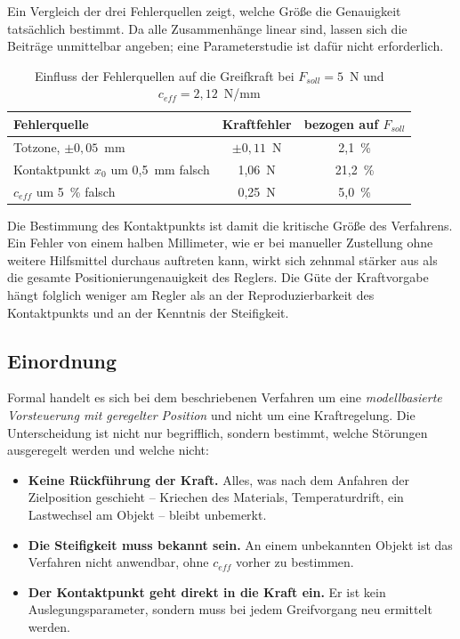 Ein Vergleich der drei Fehlerquellen zeigt, welche Größe die Genauigkeit tatsächlich
bestimmt. Da alle Zusammenhänge linear sind, lassen sich die Beiträge unmittelbar
angeben; eine Parameterstudie ist dafür nicht erforderlich.

\begin{table}[htbp]
    \centering
    \caption{Einfluss der Fehlerquellen auf die Greifkraft bei $F_{soll} = 5$~N und
             $c_{eff} = 2{,}12$~N/mm}
    \label{tab:fehlerquellen}
    \begin{tabular}{lcc}
        \hline
        Fehlerquelle & Kraftfehler & bezogen auf $F_{soll}$ \\
        \hline
        Totzone, $\pm 0{,}05$~mm          & $\pm 0{,}11$~N & 2,1~\% \\
        Kontaktpunkt $x_0$ um 0,5~mm falsch & 1,06~N        & 21,2~\% \\
        $c_{eff}$ um 5~\% falsch           & 0,25~N        & 5,0~\% \\
        \hline
    \end{tabular}
\end{table}

Die Bestimmung des Kontaktpunkts ist damit die kritische Größe des Verfahrens. Ein Fehler
von einem halben Millimeter, wie er bei manueller Zustellung ohne weitere Hilfsmittel
durchaus auftreten kann, wirkt sich zehnmal stärker aus als die gesamte
Positionierungenauigkeit des Reglers. Die Güte der Kraftvorgabe hängt folglich weniger am
Regler als an der Reproduzierbarkeit des Kontaktpunkts und an der Kenntnis der
Steifigkeit.

\subsection*{Einordnung}

Formal handelt es sich bei dem beschriebenen Verfahren um eine \emph{modellbasierte
Vorsteuerung mit geregelter Position} und nicht um eine Kraftregelung. Die Unterscheidung
ist nicht nur begrifflich, sondern bestimmt, welche Störungen ausgeregelt werden und
welche nicht:

\begin{itemize}
    \item \textbf{Keine Rückführung der Kraft.} Alles, was nach dem Anfahren der
          Zielposition geschieht -- Kriechen des Materials, Temperaturdrift, ein
          Lastwechsel am Objekt -- bleibt unbemerkt.
    \item \textbf{Die Steifigkeit muss bekannt sein.} An einem unbekannten Objekt ist das
          Verfahren nicht anwendbar, ohne $c_{eff}$ vorher zu bestimmen.
    \item \textbf{Der Kontaktpunkt geht direkt in die Kraft ein.} Er ist kein
          Auslegungsparameter, sondern muss bei jedem Greifvorgang neu ermittelt werden.
\end{itemize}

